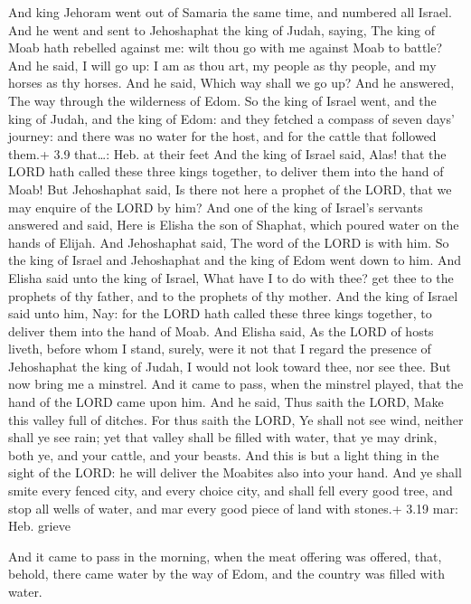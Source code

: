  And king Jehoram went out of Samaria the same time, and
numbered all Israel.  And he went and sent to Jehoshaphat
the king of Judah, saying, The king of Moab hath rebelled against me:
wilt thou go with me against Moab to battle? And he said, I will go up:
I am as thou art, my people as thy people, and my horses as thy horses.
 And he said, Which way shall we go up? And he answered, The
way through the wilderness of Edom.  So the king of Israel
went, and the king of Judah, and the king of Edom: and they fetched a
compass of seven days' journey: and there was no water for the host, and
for the cattle that followed them.+ 3.9 that\ldots: Heb. at their feet
 And the king of Israel said, Alas! that the LORD hath
called these three kings together, to deliver them into the hand of
Moab!  But Jehoshaphat said, Is there not here a prophet of
the LORD, that we may enquire of the LORD by him? And one of the king of
Israel's servants answered and said, Here is Elisha the son of Shaphat,
which poured water on the hands of Elijah.  And Jehoshaphat
said, The word of the LORD is with him. So the king of Israel and
Jehoshaphat and the king of Edom went down to him.  And
Elisha said unto the king of Israel, What have I to do with thee? get
thee to the prophets of thy father, and to the prophets of thy mother.
And the king of Israel said unto him, Nay: for the LORD hath called
these three kings together, to deliver them into the hand of Moab.
 And Elisha said, As the LORD of hosts liveth, before whom
I stand, surely, were it not that I regard the presence of Jehoshaphat
the king of Judah, I would not look toward thee, nor see thee.
 But now bring me a minstrel. And it came to pass, when the
minstrel played, that the hand of the LORD came upon him. 
And he said, Thus saith the LORD, Make this valley full of ditches.
 For thus saith the LORD, Ye shall not see wind, neither
shall ye see rain; yet that valley shall be filled with water, that ye
may drink, both ye, and your cattle, and your beasts.  And
this is but a light thing in the sight of the LORD: he will deliver the
Moabites also into your hand.  And ye shall smite every
fenced city, and every choice city, and shall fell every good tree, and
stop all wells of water, and mar every good piece of land with stones.+
3.19 mar: Heb. grieve

 And it came to pass in the morning, when the meat offering
was offered, that, behold, there came water by the way of Edom, and the
country was filled with water.

